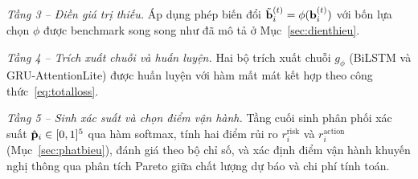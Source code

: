 \textit{Tầng 3 -- Điền giá trị thiếu.} Áp dụng phép biến đổi $\tilde{\mathbf{b}}_i^{(t)} = \phi(\mathbf{b}_i^{(t)})$ với bốn lựa chọn $\phi$ được benchmark song song như đã mô tả ở Mục~\ref{sec:dienthieu}.

\textit{Tầng 4 -- Trích xuất chuỗi và huấn luyện.} Hai bộ trích xuất chuỗi $g_\phi$ (BiLSTM và GRU-AttentionLite) được huấn luyện với hàm mất mát kết hợp theo công thức~\eqref{eq:totalloss}.

\textit{Tầng 5 -- Sinh xác suất và chọn điểm vận hành.} Tầng cuối sinh phân phối xác suất $\hat{\mathbf{p}}_i \in [0,1]^5$ qua hàm softmax, tính hai điểm rủi ro $r_i^{\text{risk}}$ và $r_i^{\text{action}}$ (Mục~\ref{sec:phatbieu}), đánh giá theo bộ chỉ số, và xác định điểm vận hành khuyến nghị thông qua phân tích Pareto giữa chất lượng dự báo và chi phí tính toán.

